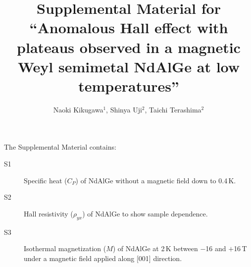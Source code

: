 \documentclass[%
preprint,
 amsmath,amssymb,
 aps,
]{revtex4-2}
\begin{document}

\title{Supplemental Material for\\ ``Anomalous Hall effect with plateaus observed in a magnetic Weyl semimetal NdAlGe at low temperatures''}%

\author{
Naoki Kikugawa$^{1}$, 
Shinya Uji$^{2}$, 
Taichi Terashima$^{2}$
}





\maketitle



\setcounter{equation}{0}
\setcounter{figure}{0}
\setcounter{table}{0}
\setcounter{page}{1}
\makeatletter
\renewcommand{\theequation}{S\arabic{equation}}
\renewcommand{\thefigure}{S\arabic{figure}}
\renewcommand{\bibnumfmt}[1]{[S#1]}
\renewcommand{\citenumfont}[1]{S#1}


The Supplemental Material contains: 

\begin{description}
%
%
%
%
%
\item[S1] Specific heat ($C_{P}$) of NdAlGe without a magnetic field down to 0.4\,K. 

\item[S2] Hall resistivity ($\rho_{yx}$) of NdAlGe to show sample dependence. 

\item[S3] Isothermal magnetization ($M$) of NdAlGe at 2\,K between $-$16 and $+$16\,T 
under a magnetic field applied along $\lbrack$001$\rbrack$ direction. 

\end{description}
\end{document}
